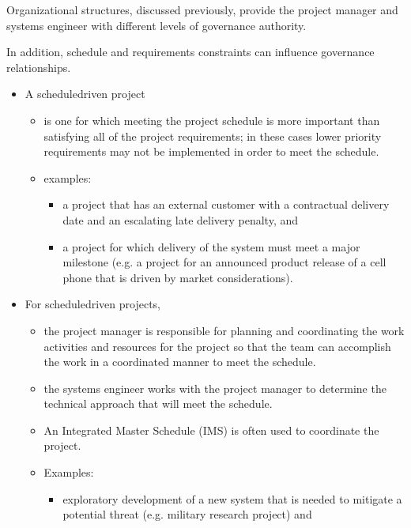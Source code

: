 \documentclass[letterpaper,10pt,english]{jupyterBook}
\begin{document}
\sphinxAtStartPar
Organizational structures, discussed previously, provide the project manager and systems engineer with different
levels of governance authority.

\sphinxAtStartPar
In addition, schedule and requirements constraints can influence governance
relationships.
\begin{itemize}
\item {} 
\sphinxAtStartPar
A schedule\sphinxhyphen{}driven project
\begin{itemize}
\item {} 
\sphinxAtStartPar
is one for which meeting the project schedule is more important than satisfying all of the project requirements; in these cases lower priority requirements may not be implemented in order to meet the schedule.

\item {} 
\sphinxAtStartPar
examples:
\begin{itemize}
\item {} 
\sphinxAtStartPar
a project that has an external customer with a contractual delivery date and an escalating late delivery penalty, and

\item {} 
\sphinxAtStartPar
a project for which delivery of the system must meet a major milestone (e.g. a project for an announced product release of a cell phone that is driven by market considerations).

\end{itemize}

\end{itemize}

\item {} 
\sphinxAtStartPar
For schedule\sphinxhyphen{}driven projects,
\begin{itemize}
\item {} 
\sphinxAtStartPar
the project manager is responsible for planning and coordinating the work activities and resources for the project so that the team can accomplish the work in a coordinated manner to meet the schedule.

\item {} 
\sphinxAtStartPar
the systems engineer works with the project manager to determine the technical approach that will meet the schedule.

\item {} 
\sphinxAtStartPar
An Integrated Master Schedule (IMS) is often used to coordinate the project.

\item {} 
\sphinxAtStartPar
Examples:
\begin{itemize}
\item {} 
\sphinxAtStartPar
exploratory development of a new system that is needed to mitigate a potential threat (e.g. military research
project) and


\end{itemize}
\end{itemize}
\end{itemize}
\end{document}
